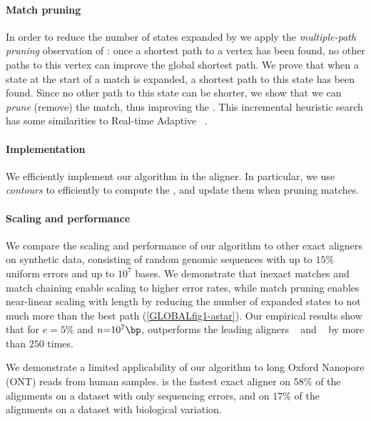 \paragraph{Match pruning}
In order to reduce the number of states expanded by \A we apply the
\emph{multiple-path pruning} observation of \citet{poole2017artificial}: once a
shortest path to a vertex has been found, no other paths to this vertex can
improve the global shortest path. We prove that when a state at the start of a
match is expanded, a shortest path to this state has been found. Since no other
path to this state can be shorter, we show that we can \emph{prune} (remove) the
match, thus improving the \sh. This incremental heuristic search has some
similarities to Real-time Adaptive \A~\citep{koenig2006real}.

\paragraph{Implementation}
We efficiently implement our algorithm in the \astarpa aligner. In particular,
we use \emph{contours}
\citep{hirschberg1977algorithms,hunt1977fast,pavetic2017fast} to efficiently to
compute the \csh, and update them when pruning matches.

\paragraph{Scaling and performance}
We compare the scaling and performance of our algorithm to other exact aligners
on synthetic data, consisting of random genomic sequences with up to $15\%$
uniform errors and up to $10^7$ bases. We demonstrate that inexact matches and
match chaining enable scaling to higher error rates, while match pruning enables
near-linear scaling with length by reducing the number of expanded states to not
much more than the best path (\cref{GLOBALfig1-astar}). Our empirical results
show that for $e{=}5\%$ and $n{=}10^7\bp$, \astarpa outperforms the leading
aligners \edlib~\citep{vsovsic2017edlib} and \wfa~\citep{marco2022optimal} by
more than $250$ times.

We demonstrate a limited applicability of our algorithm to long Oxford
Nanopore (ONT) reads from human samples. \astarpa is the fastest exact aligner
on $58\%$ of the alignments on a dataset with only sequencing
errors, and on $17\%$ of the alignments on a dataset with biological
variation.


